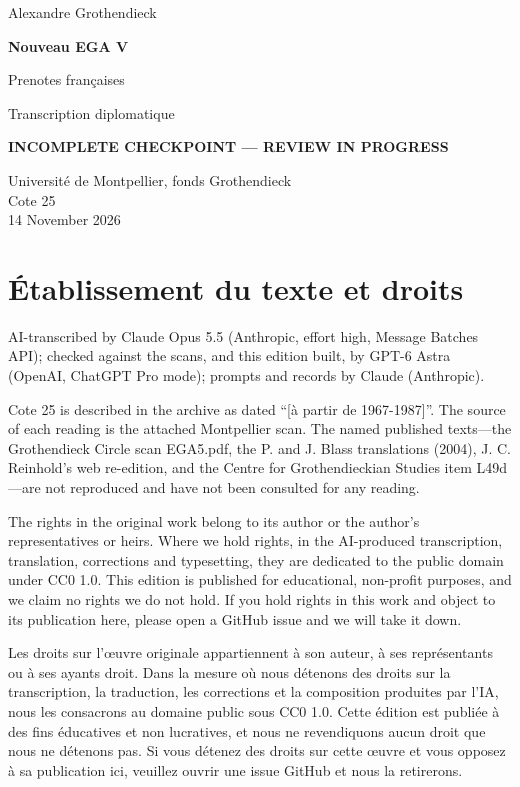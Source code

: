 \documentclass[10pt,a4paper]{article}
\newcommand{\EditionForm}{Transcription diplomatique}
\begin{document}
\hypersetup{pageanchor=false}\begin{titlepage}\thispagestyle{empty}\vspace*{20mm}
{\Large Alexandre Grothendieck\par}\vspace{12mm}
{\Huge\bfseries Nouveau EGA V\par}\vspace{8mm}
{\Large Prenotes françaises\par}\vspace{7mm}
{\large\EditionForm\par}\vspace{12mm}
{\large\bfseries\color{deletedred}INCOMPLETE CHECKPOINT — REVIEW IN PROGRESS\par}\vspace{10mm}
Université de Montpellier, fonds Grothendieck\\ Cote 25\\
14 November 2026
\vfill\end{titlepage}\clearpage\hypersetup{pageanchor=true}
\section*{Établissement du texte et droits}
AI-transcribed by Claude Opus 5.5 (Anthropic, effort high, Message Batches API); checked against the scans, and this edition built, by GPT-6 Astra (OpenAI, ChatGPT Pro mode); prompts and records by Claude (Anthropic).

Cote 25 is described in the archive as dated ``[à partir de 1967-1987]''. The source of each reading is the attached Montpellier scan. The named published texts---the Grothendieck Circle scan EGA5.pdf, the P. and J. Blass translations (2004), J. C. Reinhold's web re-edition, and the Centre for Grothendieckian Studies item L49d---are not reproduced and have not been consulted for any reading.

The rights in the original work belong to its author or the author's representatives or heirs. Where we hold rights, in the AI-produced transcription, translation, corrections and typesetting, they are dedicated to the public domain under CC0 1.0. This edition is published for educational, non-profit purposes, and we claim no rights we do not hold. If you hold rights in this work and object to its publication here, please open a GitHub issue and we will take it down.

Les droits sur l'œuvre originale appartiennent à son auteur, à ses représentants ou à ses ayants droit. Dans la mesure où nous détenons des droits sur la transcription, la traduction, les corrections et la composition produites par l'IA, nous les consacrons au domaine public sous CC0 1.0. Cette édition est publiée à des fins éducatives et non lucratives, et nous ne revendiquons aucun droit que nous ne détenons pas. Si vous détenez des droits sur cette œuvre et vous opposez à sa publication ici, veuillez ouvrir une issue GitHub et nous la retirerons.
\end{document}
